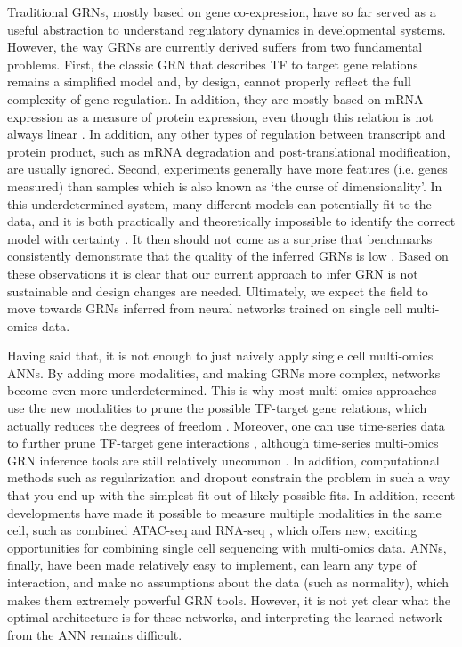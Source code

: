 Traditional GRNs, mostly based on gene co-expression, have so far served as a useful abstraction to understand regulatory dynamics in developmental systems. However, the way GRNs are currently derived suffers from two fundamental problems. First, the classic GRN that describes TF to target gene relations remains a simplified model and, by design, cannot properly reflect the full complexity of gene regulation. In addition, they are mostly based on mRNA expression as a measure of protein expression, even though this relation is not always linear \cite{de_Sousa_Abreu_2009}. In addition, any other types of regulation between transcript and protein product, such as mRNA degradation and post-translational modification, are usually ignored. Second, experiments generally have more features (i.e. genes measured) than samples which is also known as ‘the curse of dimensionality'. In this underdetermined system, many different models can potentially fit to the data, and it is both practically and theoretically impossible to identify the correct model with certainty \cite{Krishnan_2007}. It then should not come as a surprise that benchmarks consistently demonstrate that the quality of the inferred GRNs is low \cite{Chen_2018,Pratapa_2020,Cokelaer_2016,dream,Guo_2017,Marbach_2012,STOLOVITZKY_2007}. Based on these observations it is clear that our current approach to infer GRN is not sustainable and design changes are needed. Ultimately, we expect the field to move towards GRNs inferred from neural networks trained on single cell multi-omics data.

Having said that, it is not enough to just naively apply single cell multi-omics ANNs. By adding more modalities, and making GRNs more complex, networks become even more underdetermined. This is why most multi-omics approaches use the new modalities to prune the possible TF-target gene relations, which actually reduces the degrees of freedom \cite{Xu_2020,Aibar_2017,Jiang_2021,Kamimoto_2020}. Moreover, one can use time-series data to further prune TF-target gene interactions \cite{Zoppoli_2010}, although time-series multi-omics GRN inference tools are still relatively uncommon \cite{Ernst_2007,Schulz_2012,Ding_2018,Conard_2021}. In addition, computational methods such as regularization \cite{Buhlmann} and dropout \cite{srivastava14a} constrain the problem in such a way that you end up with the simplest fit out of likely possible fits. In addition, recent developments have made it possible to measure multiple modalities in the same cell, such as combined ATAC-seq and RNA-seq \cite{Ma_2020,Cao_2018,Chen_2019}, which offers new, exciting opportunities for combining single cell sequencing with multi-omics data. ANNs, finally, have been made relatively easy to implement, can learn any type of interaction, and make no assumptions about the data (such as normality), which makes them extremely powerful GRN tools. However, it is not yet clear what the optimal architecture is for these networks, and interpreting the learned network from the ANN remains difficult.

